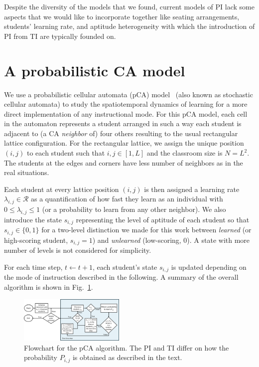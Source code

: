 \documentclass[twocolumn,secnumarabic,amssymb, nobibnotes, aps, prd]{revtex4-2}
\begin{document}
    Despite the diversity of the models that we found, current models of PI lack some aspects that we would like to incorporate together like seating arrangements, students' learning rate, and aptitude heterogeneity with which the introduction of PI from TI are typically founded on.
    
\section{A probabilistic CA model}

    We use a probabilistic cellular automata (pCA) model~\cite{SelfSPP} (also known as stochastic cellular automata) to study the spatiotemporal dynamics of learning for a more direct implementation of any instructional mode.
    For this pCA model, each cell in the automaton represents a student arranged in such a way each student is adjacent to (a CA {\it neighbor} of) four others resulting to the usual rectangular lattice configuration.
    For the rectangular lattice, we assign the unique position $(i,j)$ to each student such that $i,j\in[1,L]$ and the classroom size is $N=L^2$.
    The students at the edges and corners have less number of neighbors as in the real situations.

    Each student at every lattice position $(i,j)$ is then assigned a learning rate
    $\lambda_{i,j} \in \mathcal{R}$ 
    as a quantification of how fast they learn as an individual with
    $0{\leq}\lambda_{i,j}{\leq}1$
    (or a probability to learn from any other neighbor).
    We also introduce the state $s_{i,j}$ representing the level of aptitude of each student so that
    $s_{i,j}\in\lbrace{0,1}\rbrace$
    for a two-level distinction we made for this work between {\it learned} (or high-scoring student, $s_{i,j}=1$) and {\it unlearned} (low-scoring, $0$).
    A state with more number of levels is not considered for simplicity.

    For each time step, $t{\leftarrow}t+1$, each student's state $s_{i,j}$ is updated depending on the mode of instruction described in the following.
    A summary of the overall algorithm is shown in Fig.~\ref{fig:pCA-flowchart}.
    \begin{figure}[htb]
        \centering
        \includegraphics[width=0.45\textwidth]{figures/2DBPCA Flowchart.png}
        \caption{%
            Flowchart for the pCA algorithm.
            The PI and TI differ on how the probability $P_{i,j}$ is obtained as described in the text.
        }\label{fig:pCA-flowchart}
    \end{figure}
\end{document}
